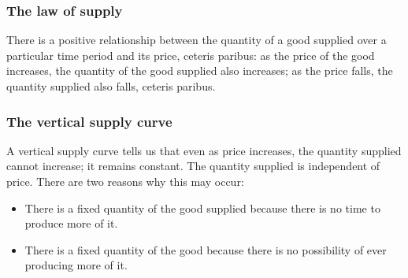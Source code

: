 \documentclass[a4paper,12pt]{article}
\begin{document}
\subsubsection*{The law of supply}
There is a positive relationship between the quantity of a good supplied over a particular time period and its price, ceteris paribus: as the price of the good increases, the quantity
of the good supplied also increases; as the price falls, the quantity supplied also falls, ceteris paribus.
\subsubsection*{The vertical supply curve}
A vertical supply curve tells us that even as price increases, the quantity supplied cannot increase; it remains constant. The quantity supplied is independent of price. There are two reasons why this may occur:
\begin{itemize}
  \item There is a fixed quantity of the good supplied because there is no time to produce more of it.
  \item There is a fixed quantity of the good because there is no possibility of ever producing more of it. 
\end{itemize}
\end{document}
